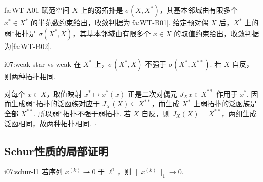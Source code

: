 \begin{FADefinition}{fa:WT-A01}
赋范空间 \(\displaystyle X\) 上的弱拓扑是 \(\displaystyle \sigma(X,X^*)\)，其基本邻域由有限多个 \(\displaystyle x^*\in X^*\) 的半范数约束给出，收敛判据为\autoref{fa:WT-B01}. 给定预对偶 \(\displaystyle X\) 后，\(\displaystyle X^*\) 上的弱*拓扑是 \(\displaystyle \sigma(X^*,X)\)，其基本邻域由有限多个 \(\displaystyle x\in X\) 的取值约束给出，收敛判据为\autoref{fa:WT-B02}.
\end{FADefinition}

\begin{FAProposition}{i07:weak-star-vs-weak}
在 \(\displaystyle X^*\) 上，\(\displaystyle \sigma(X^*,X)\) 不强于 \(\displaystyle \sigma(X^*,X^{**})\). 若 \(\displaystyle X\) 自反，则两种拓扑相同.
\end{FAProposition}

\begin{FAProof}
对每个 \(\displaystyle x\in X\)，取值映射 \(\displaystyle x^*\mapsto x^*(x)\) 正是二次对偶元 \(\displaystyle J_Xx\in X^{**}\) 作用于 \(\displaystyle x^*\). 因而生成弱*拓扑的泛函族对应于 \(\displaystyle J_X(X)\subseteq X^{**}\)，而生成 \(\displaystyle X^*\) 上弱拓扑的泛函族是全部 \(\displaystyle X^{**}\). 所以弱*拓扑不强于弱拓扑. 若 \(\displaystyle X\) 自反，则 \(\displaystyle J_X(X)=X^{**}\)，两组生成泛函相同，故两种拓扑相同.
\hfill\(\square\)
\end{FAProof}

\subsection{Schur性质的局部证明}

\begin{FAProposition}{i07:schur-l1}
若序列 \(\displaystyle x^{(k)}\rightharpoonup0\) 于 \(\displaystyle \ell^1\)，则 \(\displaystyle \|x^{(k)}\|_1\to0\).
\end{FAProposition}

